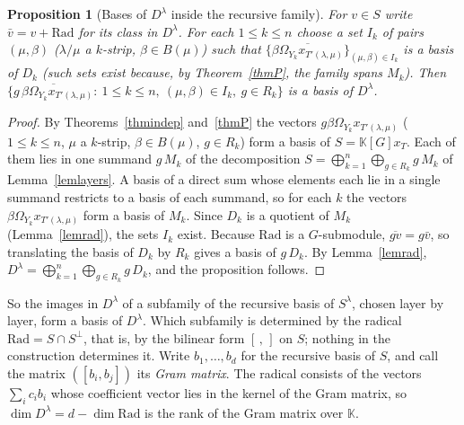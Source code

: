 \documentclass[11pt, letterpaper]{amsart}
\newtheorem{proposition}{Proposition}
\theoremstyle{definition}
\theoremstyle{remark}
\newcommand{\KK}{\mathbb{K}}
\begin{document}
\begin{proposition}[Bases of $D^\lambda$ inside the recursive family]\label{propD}
For $v\in S$ write $\bar v=v+\mathrm{Rad}$ for its class in $D^\lambda$. For each $1\le k\le n$ choose a set $I_k$ of pairs $(\mu,\beta)$ ($\lambda/\mu$ a $k$-strip, $\beta\in B(\mu)$) such that $\{\overline{\beta \Omega_{Y_k}x_{T'(\lambda,\mu)}}\}_{(\mu,\beta)\in I_k}$ is a basis of $D_k$ (such sets exist because, by Theorem~\ref{thmP}, the family spans $M_k$). Then $\{\overline{g\,\beta \Omega_{Y_k}x_{T'(\lambda,\mu)}}:\ 1\le k\le n,\ (\mu,\beta)\in I_k,\ g\in R_k\}$ is a basis of $D^\lambda$.
\end{proposition}
\begin{proof}
By Theorems~\ref{thmindep} and~\ref{thmP} the vectors $g\beta \Omega_{Y_k}x_{T'(\lambda,\mu)}$ ($1\le k\le n$, $\mu$ a $k$-strip, $\beta\in B(\mu)$, $g\in R_k$) form a basis of $S=\KK[G]x_T$. Each of them lies in one summand $g\,M_k$ of the decomposition $S=\bigoplus_{k=1}^n\bigoplus_{g\in R_k}g\,M_k$ of Lemma~\ref{lemlayers}. A basis of a direct sum whose elements each lie in a single summand restricts to a basis of each summand, so for each $k$ the vectors $\beta \Omega_{Y_k}x_{T'(\lambda,\mu)}$ form a basis of $M_k$. Since $D_k$ is a quotient of $M_k$ (Lemma~\ref{lemrad}), the sets $I_k$ exist. Because $\mathrm{Rad}$ is a $G$-submodule, $\overline{gv}=g\bar v$, so translating the basis of $D_k$ by $R_k$ gives a basis of $g\,D_k$. By Lemma~\ref{lemrad}, $D^\lambda=\bigoplus_{k=1}^n\bigoplus_{g\in R_k}g\,D_k$, and the proposition follows.
\end{proof}

So the images in $D^\lambda$ of a subfamily of the recursive basis of $S^\lambda$, chosen layer by layer, form a basis of $D^\lambda$. Which subfamily is determined by the radical $\mathrm{Rad}=S\cap S^\perp$, that is, by the bilinear form $[\,,\,]$ on $S$; nothing in the construction determines it. Write $b_1,\dots,b_d$ for the recursive basis of $S$, and call the matrix $([b_i,b_j])$ its \emph{Gram matrix}. The radical consists of the vectors $\sum_ic_ib_i$ whose coefficient vector lies in the kernel of the Gram matrix, so $\dim D^\lambda=d-\dim\mathrm{Rad}$ is the rank of the Gram matrix over $\KK$.
\end{document}
